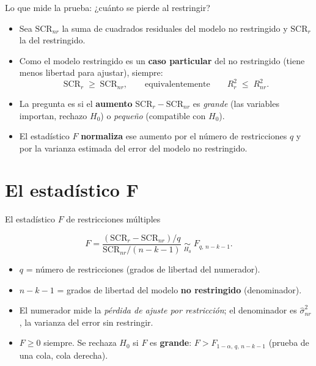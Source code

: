 \documentclass{beamer}
\begin{document}
\begin{frame}{Lo que mide la prueba: ¿cuánto se pierde al restringir?}
\begin{itemize}
    \item Sea $\text{SCR}_{nr}$ la suma de cuadrados residuales del modelo no restringido y $\text{SCR}_r$ la del restringido.
    \pause
    \item Como el modelo restringido es un \textbf{caso particular} del no restringido (tiene menos libertad para ajustar), siempre:
    \[
        \text{SCR}_r \;\geq\; \text{SCR}_{nr}, \qquad\text{equivalentemente}\qquad R^2_r \;\leq\; R^2_{nr}.
    \]
    \pause
    \item La pregunta es si el \textbf{aumento} $\text{SCR}_r - \text{SCR}_{nr}$ es \emph{grande} (las variables importan, rechazo $H_0$) o \emph{pequeño} (compatible con $H_0$).
    \pause
    \item El estadístico $F$ \textbf{normaliza} ese aumento por el número de restricciones $q$ y por la varianza estimada del error del modelo no restringido.
\end{itemize}
\end{frame}

\section{El estadístico F}

\begin{frame}{El estadístico $F$ de restricciones múltiples}
\begin{tcolorbox}[colback=blue!5!white, colframe=blue!75!black, title=Estadístico $F$ (forma SCR)]
\[
   F = \frac{(\text{SCR}_r - \text{SCR}_{nr})/q}{\text{SCR}_{nr}/(n-k-1)} \;\underset{H_0}{\sim}\; F_{q,\,n-k-1}.
\]
\end{tcolorbox}
\begin{itemize}
    \item $q$ = número de restricciones (grados de libertad del numerador).
    \item $n-k-1$ = grados de libertad del modelo \textbf{no restringido} (denominador).
    \pause
    \item El numerador mide la \emph{pérdida de ajuste por restricción}; el denominador es $\hat{\sigma}^2_{nr}$, la varianza del error sin restringir.
    \pause
    \item $F \geq 0$ siempre. Se rechaza $H_0$ si $F$ es \textbf{grande}: $F > F_{1-\alpha,\,q,\,n-k-1}$ (prueba de una cola, cola derecha).
\end{itemize}
\end{frame}
\end{document}
